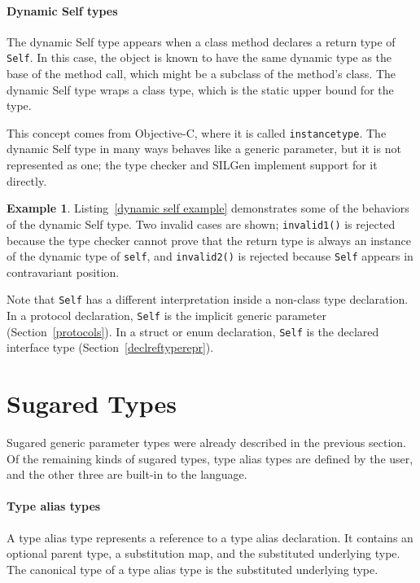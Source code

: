 \documentclass[a4paper,headsepline,bibliography=totoc,toc=flat,fleqn,twoside=semi]{scrbook}
\theoremstyle{definition}
\theoremstyle{definition}
\newtheorem{example}{Example}[chapter]
\theoremstyle{definition}
\begin{document}
\paragraph{Dynamic Self types}
The dynamic Self type appears when a class method declares a return type of \texttt{Self}. In this case, the object is known to have the same dynamic type as the base of the method call, which might be a subclass of the method's class. The dynamic Self type wraps a class type, which is the static upper bound for the type.

This concept comes from Objective-C, where it is called \texttt{instancetype}. The dynamic Self type in many ways behaves like a generic parameter, but it is not represented as one; the type checker and SILGen implement support for it directly.
\begin{example} Listing~\ref{dynamic self example} demonstrates some of the behaviors of the dynamic Self type. Two invalid cases are shown; \texttt{invalid1()} is rejected because the type checker cannot prove that the return type is always an instance of the dynamic type of \texttt{self}, and \texttt{invalid2()} is rejected because \texttt{Self} appears in contravariant position.

Note that \texttt{Self} has a different interpretation inside a non-class type declaration. In a protocol declaration, \texttt{Self} is the implicit generic parameter (Section~\ref{protocols}). In a struct or enum declaration, \texttt{Self} is the declared interface type (Section~\ref{declreftyperepr}).
\end{example}

\section{Sugared Types}\label{sugared types}

Sugared generic parameter types were already described in the previous section. Of the remaining kinds of sugared types, type alias types are defined by the user, and the other three are built-in to the language.

\paragraph{Type alias types} A type alias type represents a reference to a type alias declaration. It contains an optional parent type, a substitution map, and the substituted underlying type. The canonical type of a type alias type is the substituted underlying type.
\end{document}
